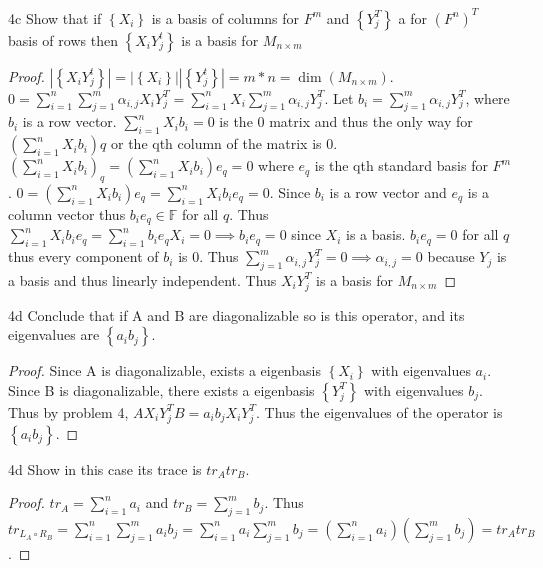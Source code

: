 \documentclass{article}
\begin{document}
\begin{claim}{4c}\label{Claim 4c.}
    Show that if $\left\{ X_i \right\}$ is a basis of columns for $F^m$  and $\left\{ Y_j^T \right\}$ a for $(F^n)^T$ basis of rows then $\left\{ X_i Y_j^t \right\}$ is a basis for $M_{n \times m}$
\end{claim}
\begin{proof}
    $|\left\{ X_i Y_j^t \right\}| = |\left\{ X_i \right\}||\left\{ Y_j^t \right\}| = m * n = \dim(M_{n \times m})$. $0 = \sum_{i = 1}^{n} \sum_{j = 1}^{m} \alpha_{i, j} X_i Y_j^T = \sum_{i=1}^{n} X_i \sum_{j = 1}^{m} \alpha_{i, j} Y_j^T$. Let $b_i = \sum_{j = 1}^{m} \alpha_{i, j} Y_j^T$, where $b_i$ is a row vector. $\sum_{i = 1}^{n}X_i b_i = 0$ is the 0 matrix and thus the only way for $\left(\sum_{i = 1}^{n}X_i b_i\right)q$ or the qth column of the matrix is 0. $\left(\sum_{i = 1}^{n}X_i b_i\right)_q = \left(\sum_{i = 1}^{n}X_i b_i\right)e_q = 0$ where $e_q$ is the qth standard basis for $F^m$. $0 = \left(\sum_{i = 1}^{n}X_i b_i\right)e_q = \sum_{i = 1}^{n}X_i b_ie_q = 0$. Since $b_i$ is a row vector and $e_q$ is a column vector thus $b_ie_q \in \mathbb{F}$ for all $q$. Thus $\sum_{i = 1}^{n}X_i b_ie_q =  \sum_{i = 1}^{n}b_ie_q X_i = 0 \implies b_ie_q = 0$ since $X_i$ is a basis. $b_ie_q = 0$ for all $q$ thus every component of $b_i$ is 0. Thus $\sum_{j = 1}^{m} \alpha_{i, j} Y_j^T = 0 \implies \alpha_{i, j} = 0$ because $Y_j$ is a basis and thus linearly independent. Thus ${X_i Y_j^T}$ is a basis for $M_{n\times m}$       
\end{proof}
\begin{claim}{4d}\label{Claim 4d.}
    Conclude that if A and B are diagonalizable so is this operator, and its eigenvalues are $\left\{ a_i b_j \right\}$.
\end{claim}
\begin{proof}
    Since A is diagonalizable, exists a eigenbasis $\left\{ X_i \right\}$ with eigenvalues $a_i$. Since B is diagonalizable, there exists a eigenbasis $\left\{ Y_j^T \right\}$ with eigenvalues $b_j$. Thus by problem 4, $AX_i Y_j^T B = a_i b_j X_i Y_j^T$. Thus the eigenvalues of the operator is $\left\{ a_i b_j \right\}$.      
\end{proof}
\begin{claim}{4d}\label{Claim 4d.}
    Show in this case its trace is $tr_A tr_B$.
\end{claim}
\begin{proof}
    $tr_A = \sum_{i = 1}^{n} a_i$ and $tr_B = \sum_{j = 1}^{m}b_j$. Thus $tr_{L_{A} \circ R_{B}} = \sum_{i = 1}^{n} \sum_{j = 1}^{m} a_i b_j = \sum_{i = 1}^{n} a_i \sum_{j = 1}^{m}  b_j = \left(\sum_{i = 1}^{n} a_i\right) \left(\sum_{j = 1}^{m}  b_j\right) = tr_A tr_B$. 
\end{proof}
\end{document}
